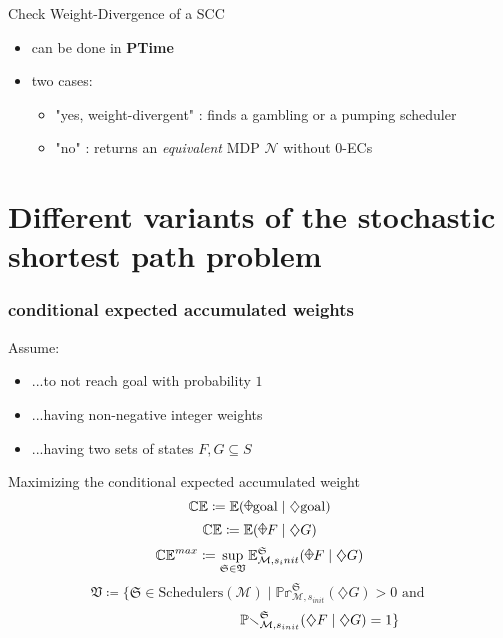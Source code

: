 \documentclass[onlymath]{beamer}
\begin{document}
\begin{frame}
\begin{block}{Check Weight-Divergence of a SCC}
	\begin{itemize}
		\item can be done in \textbf{PTime}
		\item two cases:
		\begin{itemize}
			\item "yes, weight-divergent" : finds a gambling or a pumping scheduler
			\item "no" : returns an \textit{equivalent} MDP $\mathcal{N}$ without 0-ECs
		\end{itemize}
	\end{itemize}
\end{block}
\end{frame}


\section{Different variants of the stochastic shortest path problem}

\begin{frame}
	\frametitle{conditional expected accumulated weights}
	Assume:
	\begin{itemize}
		\item ...to not reach goal with probability $1$
		\item ...having non-negative integer weights
		\item ...having two sets of states $F,G \subseteq S$
	\end{itemize}
	\begin{block}{Maximizing the conditional expected accumulated weight}
		\[
			\mathbb{CE} \coloneqq \mathbb{E}(\rawdiaplus \mathrm{goal} \mid \diamondsuit \mathrm{goal})
		\]
		\[
			\mathbb{CE} \coloneqq \mathbb{E}(\rawdiaplus F \mid \diamondsuit G)
		\]
		\[
			\mathbb{CE}^{max} \coloneqq \sup_{\mathfrak{S} \in \mathfrak{V}}\mathbb{E}_{\mathcal{M},s_init}^{\mathfrak{S}}(\rawdiaplus F \mid \diamondsuit G)
		\]
		\[
			\mathfrak{V} \coloneqq \{\mathfrak{S} \in \mathrm{Schedulers}(\mathcal{M}) \mid \mathbb{Pr}_{\mathcal{M},s_{init}}^{\mathfrak{S}}(\diamondsuit G) > 0 \text{ and } \]\[ \hspace{20ex} \mathbb{Pr}_{\mathcal{M},s_{init}}^{\mathfrak{S}}(\diamondsuit F \mid \diamondsuit G) = 1 \}
		\]		
	\end{block}
\end{frame}
\end{document}

